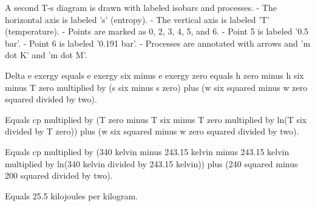 A second T-s diagram is drawn with labeled isobars and processes.  
- The horizontal axis is labeled 's' (entropy).  
- The vertical axis is labeled 'T' (temperature).  
- Points are marked as 0, 2, 3, 4, 5, and 6.  
- Point 5 is labeled '0.5 bar'.  
- Point 6 is labeled '0.191 bar'.  
- Processes are annotated with arrows and 'm dot K' and 'm dot M'.

Delta e exergy equals e exergy six minus e exergy zero equals h zero minus h six minus T zero multiplied by (s six minus s zero) plus (w six squared minus w zero squared divided by two).  

Equals cp multiplied by (T zero minus T six minus T zero multiplied by ln(T six divided by T zero)) plus (w six squared minus w zero squared divided by two).  

Equals cp multiplied by (340 kelvin minus 243.15 kelvin minus 243.15 kelvin multiplied by ln(340 kelvin divided by 243.15 kelvin)) plus (240 squared minus 200 squared divided by two).  

Equals 25.5 kilojoules per kilogram.